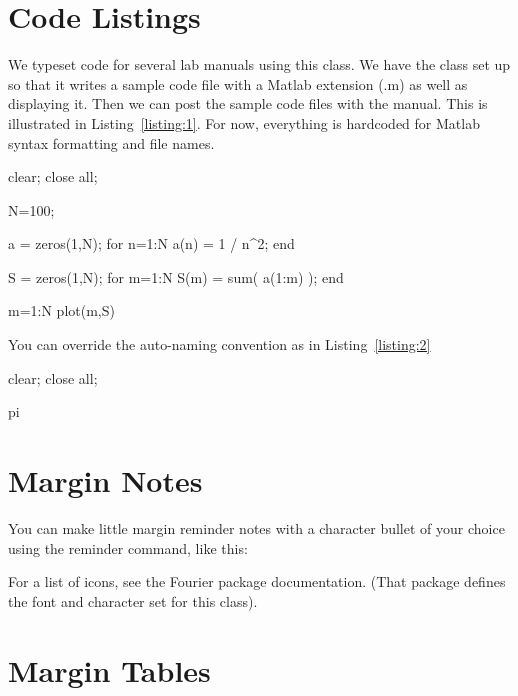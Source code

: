 \section{Code Listings}

We typeset code for several lab manuals using this class.  We have
the class set up so that it writes a sample code file with a Matlab
extension (.m) as well as displaying it.  Then we can post the
sample code files with the manual.  This is illustrated in
Listing~\ref{listing:1}.  For now, everything is hardcoded for
Matlab syntax formatting and file names.
\begin{codeexample}\label{listing:1}
\begin{VerbatimOut}{\listingFile}
clear; close all;

N=100;

a = zeros(1,N);
for n=1:N
    a(n) = 1 / n^2;
end

S = zeros(1,N);
for m=1:N
    S(m) = sum( a(1:m) );
end

m=1:N
plot(m,S)
\end{VerbatimOut}
\end{codeexample}

You can override the auto-naming convention as in
Listing~\ref{listing:2}
\begin{codeexample}[DisplayPi.m]\label{listing:2}
\begin{VerbatimOut}{\listingFile}
clear;
close all;

pi
\end{VerbatimOut}
\end{codeexample}


\section{Margin Notes}

You can make little margin reminder notes with a character bullet
of your choice using the reminder command, like this:


For a list of icons, see the Fourier package documentation.  (That
package defines the font and character set for this
class).

\section{Margin Tables}

